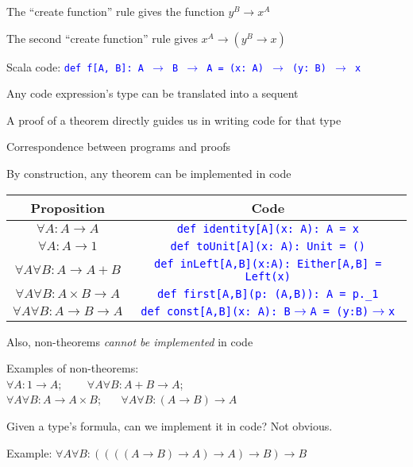 The ``create function'' rule gives the function $y^{B}\rightarrow x^{A}$

The second ``create function'' rule gives $x^{A}\rightarrow\left(y^{B}\rightarrow x\right)$

Scala code: \texttt{\textcolor{blue}{\footnotesize{}def f{[}A, B{]}:\ A
$\rightarrow$ B $\rightarrow$ A = (x:\ A) $\rightarrow$ (y:\ B)
$\rightarrow$ x}}{\footnotesize\par}

Any code expression's type can be translated into a sequent

A proof of a theorem directly guides us in writing code for that type

Correspondence between programs and proofs

By construction, any theorem can be implemented in code
\begin{center}
\begin{tabular}{|c|c|}
\hline 
\textbf{Proposition} & \textbf{Code}\tabularnewline
\hline 
\hline 
$\forall A:A\rightarrow A$ & \texttt{\textcolor{blue}{\footnotesize{}def identity{[}A{]}(x:\ A):\ A
= x}}\tabularnewline
\hline 
$\forall A:A\rightarrow1$ & \texttt{\textcolor{blue}{\footnotesize{}def toUnit{[}A{]}(x:\ A): Unit
= ()}}\tabularnewline
\hline 
$\forall A\forall B:A\rightarrow A+B$ & \texttt{\textcolor{blue}{\footnotesize{}def inLeft{[}A,B{]}(x:A):\ Either{[}A,B{]}
= Left(x)}}\tabularnewline
\hline 
$\forall A\forall B:A\times B\rightarrow A$ & \texttt{\textcolor{blue}{\footnotesize{}def first{[}A,B{]}(p:\ (A,B)):\ A
= p.\_1}}\tabularnewline
\hline 
$\forall A\forall B:A\rightarrow B\rightarrow A$ & \texttt{\textcolor{blue}{\footnotesize{}def const{[}A,B{]}(x:\ A):\ B$\rightarrow$A
= (y:B)$\rightarrow$x}}\tabularnewline
\hline 
\end{tabular}
\par\end{center}

Also, non-theorems \emph{cannot be implemented} in code 

Examples of non-theorems:\\
 $\forall A:1\rightarrow A$; \  \  $\quad\forall A\forall B:A+B\rightarrow A$;
\\
$\forall A\forall B:A\rightarrow A\times B$; \  $\quad\forall A\forall B:(A\rightarrow B)\rightarrow A$

Given a type's formula, can we implement it in code? Not obvious.

Example: $\forall A\forall B:((((A\rightarrow B)\rightarrow A)\rightarrow A)\rightarrow B)\rightarrow B$

